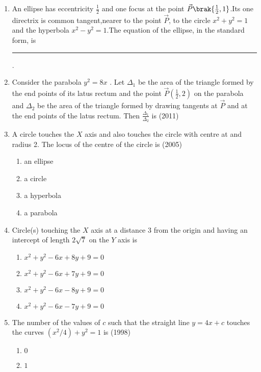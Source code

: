 \begin{enumerate}
    \item An ellipse has eccentricity $\frac{1}{2}$ and one focus at the point $\vec{P}\brak{\frac{1}{2},1}$.Its one directrix is common tangent,nearer to the point $\vec{P}$, to the circle $x^2+y^2=1$ and the hyperbola $x^2-y^2=1$.The equation of the ellipse, in the standard form, is \rule{1cm}{0.1pt}.
    \hfill{} 
\item Consider the parabola $y^2=8x$ . Let $\Delta_1$ be the area of the triangle formed by the end points of its latus rectum and the point $\Vec{P}(\frac{1}{2},2)$ on the parabola and $\Delta_2$ be the area of the triangle formed by drawing tangents at $\Vec{P}$ and at the end points of the latus rectum. Then $\frac{\Delta_1}{\Delta_2}$ is 
\hfill(2011)
\item A circle touches the $X$ axis and also touches the circle with centre at  and radius 2. The locus of the centre of the circle is
\hfill{(2005)}
\begin{multicols}{4}
\begin{enumerate}
\item an ellipse
\item a circle 
\item a hyperbola
\item a parabola
\end{enumerate}
\end{multicols}
\item Circle(s) touching the $X$ axis at a distance 3 from the origin and having an intercept of length $2\sqrt{7}$ on the $Y$ axis is 
%
\hfill{}
\begin{multicols}{2}
\begin{enumerate}
\item $x^2 + y^2 - 6x + 8y + 9 = 0$
\item $x^2 + y^2 - 6x + 7y + 9 = 0$
\item $x^2 + y^2 - 6x - 8y + 9 = 0$
\item $x^2 + y^2 - 6x - 7y + 9 = 0$
\end{enumerate}
\end{multicols}
    \item The number of the values of $c$ such that the straight line $y=4x+c$ touches the curves $(x^2/4)+y^2=1$ is \hfill(1998)\\
	\begin{multicols}{4}
\begin{enumerate}
	\item $0$
	\item $1$

\end{enumerate}
\end{multicols}
\end{enumerate}
